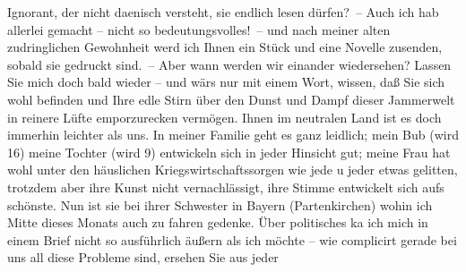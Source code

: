 \begin{ledgroupsized}[t]{13cm}
                    Ignorant, der nicht daenisch versteht, sie endlich lesen dürfen? – Auch ich hab
                    allerlei gemacht – nicht so bedeutungsvolles! – und nach meiner alten
                    zudringlichen Gewohnheit werd ich Ihnen ein Stück und eine Novelle zusenden, sobald sie gedruckt sind. – Aber
                    wann werden wir einander wiedersehen? Lassen Sie mich doch bald wieder – und
                    wärs nur mit einem Wort, wissen, daß Sie sich wohl befinden und Ihre edle Stirn
                    über den Dunst und Dampf dieser Jammerwelt in {\pb}reinere Lüfte emporzurecken vermögen. Ihnen im neutralen Land ist es doch immerhin leichter als
                    uns. In meiner Familie geht es ganz leidlich; mein Bub (wird 16) meine Tochter (wird 9) entwickeln sich in jeder
                    Hinsicht gut; meine Frau
                    hat wohl unter den häuslichen Kriegswirtschaftssorgen wie jede u jeder etwas
                    gelitten, trotzdem aber ihre Kunst nicht vernachlässigt, ihre Stimme entwickelt
                    sich aufs schönste. Nun ist sie bei ihrer Schwester in Bayern
                        (Partenkirchen) wohin ich Mitte dieses
                    Monats auch zu fahren gedenke. Über politisches ka{\geminationn}
                    ich mich in einem Brief nicht so ausführlich äußern als ich möchte – wie
                    complicirt gerade bei uns all diese Probleme sind, ersehen Sie aus jeder

\end{ledgroupsized}
